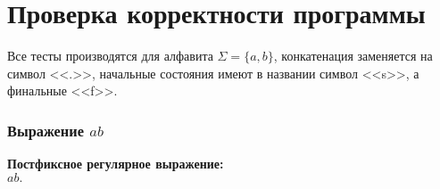             








	\section{Проверка корректности программы}
		Все тесты производятся для алфавита $\Sigma = \{a, b\}$, конкатенация заменяется на символ <<.>>,
		начальные состояния имеют в названии символ <<s>>, а финальные <<f>>.
		\subsubsection{Выражение $ab$}
			\textbf{Постфиксное регулярное выражение:}\\
				$ab.$

